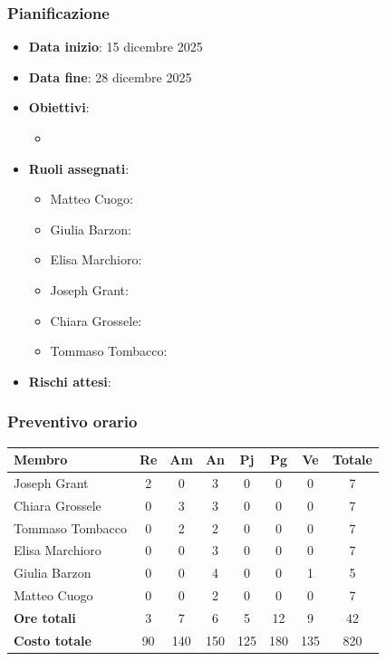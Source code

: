 \documentclass[11pt,a4paper]{article}
\begin{document}
\subsubsection{Pianificazione}
\begin{itemize}
    \item \textbf{Data inizio}: 15 dicembre 2025
    \item \textbf{Data fine}: 28 dicembre 2025
    \item \textbf{Obiettivi}:
    \begin{itemize}
        \item 
    \end{itemize}
    
    \item \textbf{Ruoli assegnati}:
    \begin{itemize}
        \item Matteo Cuogo: 
        \item Giulia Barzon: 
        \item Elisa Marchioro: 
        \item Joseph Grant: 
        \item Chiara Grossele: 
        \item Tommaso Tombacco:
    \end{itemize}
    
    \item \textbf{Rischi attesi}: 
\end{itemize}

\subsubsection{Preventivo orario}
\begin{center}
    \begin{tabular}{|l|c|c|c|c|c|c|c|}
        \hline
        \textbf{Membro} & \textbf{Re} & \textbf{Am} & \textbf{An} & \textbf{Pj} & \textbf{Pg} & \textbf{Ve} & \textbf{Totale} \\
        \hline
        Joseph Grant & 2 & 0 & 3 & 0 & 0 & 0 & 7 \\
        \hline
        Chiara Grossele & 0 & 3 & 3 & 0 & 0 & 0 & 7 \\
        \hline
        Tommaso Tombacco & 0 & 2 & 2 & 0 & 0 & 0 & 7 \\
        \hline
        Elisa Marchioro & 0 & 0 & 3 & 0 & 0 & 0 & 7 \\
        \hline
        Giulia Barzon & 0 & 0 & 4 & 0 & 0 & 1 & 5 \\
        \hline
        Matteo Cuogo & 0 & 0 & 2 & 0 & 0 & 0 & 7 \\
        \hline
        \textbf{Ore totali} & 3 & 7 & 6 & 5 & 12 & 9 & 42 \\
        \hline
        \textbf{Costo totale} & 90 & 140 & 150 & 125 & 180 & 135 & 820 \\
        \hline
    \end{tabular}
\end{center}
\end{document}
